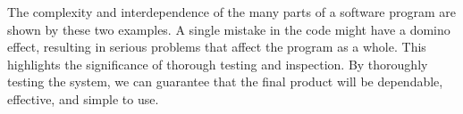 \begin{justify}
    \vspace{0.25cm}
    \newendline The complexity and interdependence of the many parts of a software program are shown by these two examples. A single mistake in the code might have a domino effect, resulting in serious problems that affect the program as a whole. This highlights the significance of thorough testing and inspection. By thoroughly testing the system, we can guarantee that the final product will be dependable, effective, and simple to use.

\end{justify}
\clearpage






\vspace{0.25cm}
